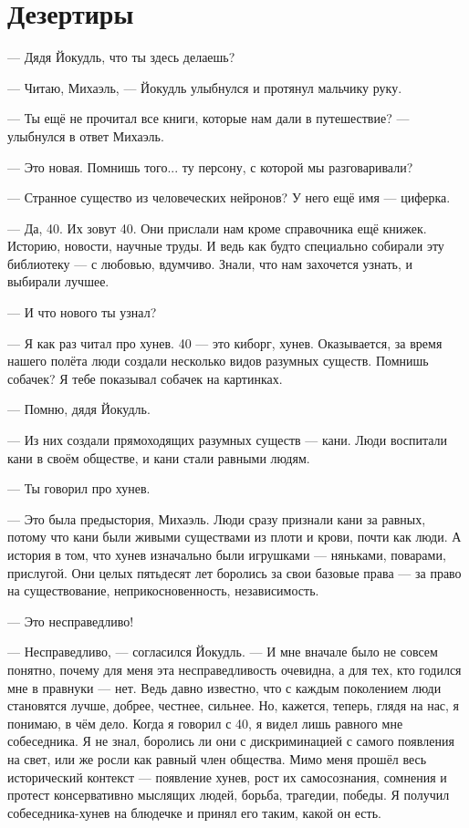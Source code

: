 \documentclass[a4paper,10pt,fleqn]{book}\usepackage{polyglossia}\setdefaultlanguage{english}\setotherlanguage{russian}\defaultfontfeatures{Ligatures=TeX,Mapping=tex-text}\usepackage{xcolor}\definecolor{lightgray}{HTML}{bbbbbb}\color{lightgray}\newcommand{\ml}[3]{\textcolor{black}{#3}}
\begin{document}
\section{Дезертиры}

--- Дядя Йокудль, что ты здесь делаешь?

--- Читаю, Михаэль, --- Йокудль улыбнулся и протянул мальчику руку.

--- Ты ещё не прочитал все книги, которые нам дали в путешествие? --- улыбнулся в ответ Михаэль.

--- Это новая.
Помнишь того... ту персону, с которой мы разговаривали?

--- Странное существо из человеческих нейронов?
У него ещё имя --- циферка.

--- Да, 40.
Их зовут 40.
Они прислали нам кроме справочника ещё книжек.
Историю, новости, научные труды.
И ведь как будто специально собирали эту библиотеку --- с любовью, вдумчиво.
Знали, что нам захочется узнать, и выбирали лучшее.

--- И что нового ты узнал?

--- Я как раз читал про хунев.
40 --- это киборг, хунев.
Оказывается, за время нашего полёта люди создали несколько видов разумных существ.
Помнишь собачек?
Я тебе показывал собачек на картинках.

--- Помню, дядя Йокудль.

--- Из них создали прямоходящих разумных существ --- кани.
Люди воспитали кани в своём обществе, и кани стали равными людям.

--- Ты говорил про хунев.

--- Это была предыстория, Михаэль.
Люди сразу признали кани за равных, потому что кани были живыми существами из плоти и крови, почти как люди.
А история в том, что хунев изначально были игрушками --- няньками, поварами, прислугой.
Они целых пятьдесят лет боролись за свои базовые права --- за право на существование, неприкосновенность, независимость.

--- Это несправедливо!

--- Несправедливо, --- согласился Йокудль.
--- И мне вначале было не совсем понятно, почему для меня эта несправедливость очевидна, а для тех, кто годился мне в правнуки --- нет.
Ведь давно известно, что с каждым поколением люди становятся лучше, добрее, честнее, сильнее.
Но, кажется, теперь, глядя на нас, я понимаю, в чём дело.
Когда я говорил с 40, я видел лишь равного мне собеседника.
Я не знал, боролись ли они с дискриминацией с самого появления на свет, или же росли как равный член общества.
Мимо меня прошёл весь исторический контекст --- появление хунев, рост их самосознания, сомнения и протест консервативно мыслящих людей, борьба, трагедии, победы.
Я получил собеседника-хунев на блюдечке и принял его таким, какой он есть.
\end{document}
